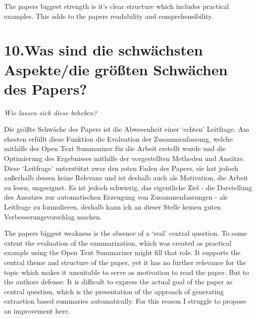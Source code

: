 \documentclass{article}
\begin{document}
\mdhr{}%

\noindent{}  The papers biggest strength is it's clear structure which includes practical examples. This adds to the papers readability and comprehensibility.%

\section{10.\hspace*{0.5em}Was sind die schwächsten Aspekte/die größten Schwächen des Papers?}\label{sec-was-sind-die-schwchsten-aspektedie-grten-schwchen-des-papers}%

\noindent{}   \emph{Wie lassen sich diese beheben?}%

   Die größte Schwäche des Papers ist die Abwesenheit einer \textquoteleft{}echten\textquoteright{} Leitfrage. Am ehesten erfüllt diese Funktion die Evaluation der Zusammenfassung, welche mithilfe des Open Text Summarizer für die Arbeit erstellt wurde und die Optimierung des Ergebnisses mithilfe der vorgestellten Methoden und Ansätze. Diese \textquoteleft{}Leitfrage\textquoteright{} unterstützt zwar den roten Faden des Papers, sie hat jedoch außerhalb dessen keine Relevanz und ist deshalb auch als Motivation, die Arbeit zu lesen, ungeeignet.
   Es ist jedoch schwierig, das eigentliche Ziel - die Darstellung des Ansatzes zur automatischen Erzeugung von Zusammenfassungen - als Leitfrage zu formulieren, deshalb kann ich an dieser Stelle keinen guten Verbesserungsvorschlag machen.%

\mdhr{}%

\noindent{}   The papers biggest weakness is the absence of a \textquoteleft{}real\textquoteright{} central question. To some extent the evaluation of the summarization, which was created as practical example using the Open Text Summarizer might fill that role. It supports the central theme and structure of the paper, yet it has no further relevance for the topic which makes it unsuitable to serve as motivation to read the paper.
   But to the authors defense: It is difficult to express the actual goal of the paper as central question, which is the presentation of the approach of generating extraction based summaries automatically. For this reason I struggle to propose an improvement here.%
\end{document}

